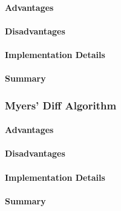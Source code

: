 \paragraph{Advantages}
\paragraph{Disadvantages}

\paragraph{Implementation Details}

\paragraph{Summary}


\subsubsection{Myers' Diff Algorithm}

\paragraph{Advantages}
\paragraph{Disadvantages}

\paragraph{Implementation Details}

\paragraph{Summary}



